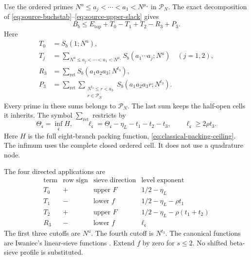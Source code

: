 Use the ordered primes
\(N^u\le a_j<\cdots<a_1<N^{\mu_*}\)
in \(\mathcal P_N\).
The exact decomposition of
\eqref{eq:source-buchstab}--\eqref{eq:source-upper-slack} gives
\begin{equation}\label{eq:k2-buchstab-upper}
 B_b\le E_{\mathrm{top}}+T_0-T_1+T_2-R_3+P_3.
\end{equation}
Here
\begin{equation}\label{eq:k2-four-rows}
\begin{aligned}
 T_0&=S_b(1;N^u),\\
 T_j&=\sum_{N^u\le a_j<\cdots<a_1<N^{\mu_*}}
                 S_b(a_1\cdots a_j;N^u)\quad(j=1,2),\\
 R_3&=\sum_{\mathrm{ret}}S_b(a_1a_2a_3;N^{t_3}),\\
 P_3&=\sum_{\mathrm{ret}}\sum_{\substack{N^{t_3}\le r<a_3\\r\in\mathcal P_N}}
                       S_b(a_1a_2a_3r;N^{t_3}).
\end{aligned}
\end{equation}
Every prime in these sums belongs to \(\mathcal P_N\).
The last sum keeps the half-open cells it inherits.
The symbol \(\sum_{\mathrm{ret}}\) restricts by
\begin{equation}\label{eq:k2-retention}
 \Theta_{\mathfrak c}=\inf_{\overline{\mathfrak c}}H,\qquad
 \ell_{\mathfrak c}=\Theta_{\mathfrak c}-\eta_L-t_1-t_2-t_3,
 \qquad \ell_{\mathfrak c}\ge2\rho t_3.
\end{equation}
Here \(H\) is the full eight-branch packing function,
\eqref{eq:classical-packing-ceiling}.
The infimum uses the complete closed ordered cell.
It does not use a quadrature node.

The four directed applications are
\begin{equation}\label{eq:k2-aa-directions}
\begin{array}{c|c|c|c}
 \text{term}&\text{row sign}&\text{sieve direction}&\text{level exponent}\\ \hline
 T_0&+&\text{upper }F&1/2-\eta_L\\
 T_1&-&\text{lower }f&1/2-\eta_L-\rho t_1\\
 T_2&+&\text{upper }F&1/2-\eta_L-\rho(t_1+t_2)\\
 R_3&-&\text{lower }f&\ell_{\mathfrak c}
\end{array}
\end{equation}
The first three cutoffs are \(N^u\).
The fourth cutoff is \(N^{t_3}\).
The canonical functions are Iwaniec's linear-sieve functions
\cite{Iwaniec1980Remainder}.
Extend \(f\) by zero for \(s\le2\).
No shifted beta-sieve profile is substituted.

